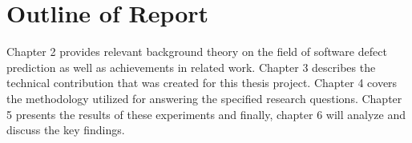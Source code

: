 \documentclass[../main.tex]{subfiles}
\begin{document}
\section{Outline of Report}
Chapter 2 provides relevant background theory on the field of software defect prediction as well as achievements in related work. Chapter 3 describes the technical contribution that was created for this thesis project. Chapter 4 covers the methodology utilized for answering the specified research questions. Chapter 5 presents the results of these experiments and finally, chapter 6 will analyze and discuss the key findings.
\end{document}

